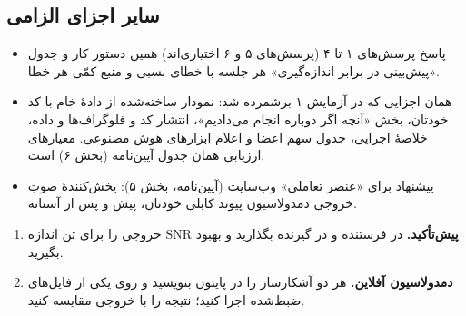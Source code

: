 \documentclass[a4paper,11pt]{article}
\begin{document}

\subsection{سایر اجزای الزامی}
\begin{itemize}
\item پاسخ پرسش‌های ۱ تا ۴ (پرسش‌های ۵ و ۶ اختیاری‌اند) همین دستور کار و جدول «پیش‌بینی در برابر اندازه‌گیری» هر جلسه با خطای نسبی و منبع کمّی هر خطا.
\item همان اجزایی که در آزمایش ۱ برشمرده شد: نمودار ساخته‌شده از دادهٔ خام با کد خودتان، بخش «آنچه اگر دوباره انجام می‌دادیم»، انتشار کد و فلوگراف‌ها و داده، خلاصهٔ اجرایی، جدول سهم اعضا و اعلام ابزارهای هوش مصنوعی. معیارهای ارزیابی همان جدول آیین‌نامه (بخش ۶) است.
\item پیشنهاد برای «عنصر تعاملی» وب‌سایت (آیین‌نامه، بخش ۵): پخش‌کنندهٔ صوتِ خروجی دمدولاسیون پیوند کابلی خودتان، پیش و پس از آستانه.
\end{itemize}

\begin{enumerate}
\item \textbf{پیش‌تأکید.} در فرستنده
و در گیرنده
بگذارید و بهبود
$\mathrm{SNR}$
خروجی را برای تن
اندازه بگیرید.
\item \textbf{دمدولاسیون آفلاین.} هر دو آشکارساز را در پایتون بنویسید و روی یکی از فایل‌های ضبط‌شده اجرا کنید؛ نتیجه را با خروجی
\GR{}
مقایسه کنید.
\end{enumerate}
\end{document}
